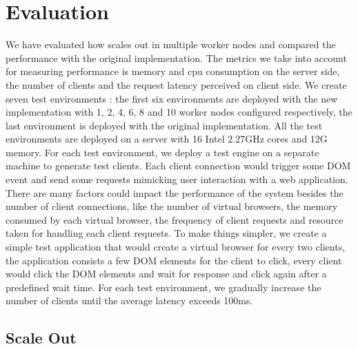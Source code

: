 \section{Evaluation}
\label{sec:eval}
We have evaluated how \cb{} scales out in multiple worker nodes and compared the performance
with the original implementation.
The metrics we take into account for measuring performance is memory and cpu consumption on the server side, 
the number of clients
and the request latency perceived on client side.
We create seven test environments : 
the first six environments are deployed with the new implementation with 1, 2, 4, 6, 8 and 10 worker nodes 
configured respectively, 
the last environment is deployed with the original implementation.
All the test environments are deployed on a server with 16 Intel 2.27GHz cores and 12G memory.
For each test environment, 
we deploy a test engine on a separate machine to generate test clients.
Each client connection would trigger some DOM event and send some requests mimicking user interaction with a web application.
There are many factors could impact the performance of the system besides the number of client connections,
like the number of virtual browsers, the memory consumed by each virtual browser, 
the frequency of client requests
and resource taken for handling each client requests.
To make things simpler, we create a simple test application that would create a virtual browser for
every two clients, the application consists a few DOM elements for the client to click,
every client would click the DOM elements and wait for response and click again after a predefined wait time.
For each test environment, 
we gradually increase the number of clients until the average latency exceeds 100ms.



\subsection{Scale Out}


\subsection{}
